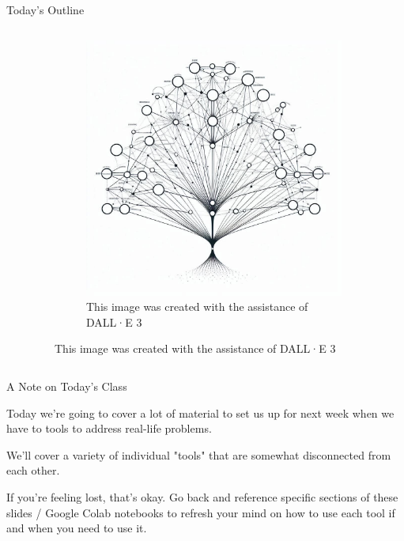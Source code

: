 \documentclass[10pt, aspectratio=169]{beamer}
\begin{document}
\begin{frame}{Today's Outline}
\begin{columns}
\begin{column}{0.5\textwidth}
\begin{enumerate}
\begin{itemize}
                \end{itemize}
            \end{enumerate}
        \end{column}
        \begin{column}{0.5\textwidth}
            \begin{figure}
                \begin{figure}
                    \includegraphics[width=0.95\linewidth]{DecisionTree.png}
                    \caption{This image was created with the assistance of DALL·E 3}
                \end{figure}
            \end{figure}
        \end{column}
    \end{columns}
\end{frame}

\begin{frame}{A Note on Today's Class}
    \begin{center}
        Today we're going to cover a lot of material to set us up for next week when we have to tools to address real-life problems.

        \vspace{1cm}

        We'll cover a variety of individual "tools" that are somewhat disconnected from each other.

        \vspace{1cm}

        If you're feeling lost, that's okay. Go back and reference specific sections of these slides / Google Colab notebooks to refresh your mind on how to use each tool if and when you need to use it.
    \end{center}
\end{frame}
\end{document}
